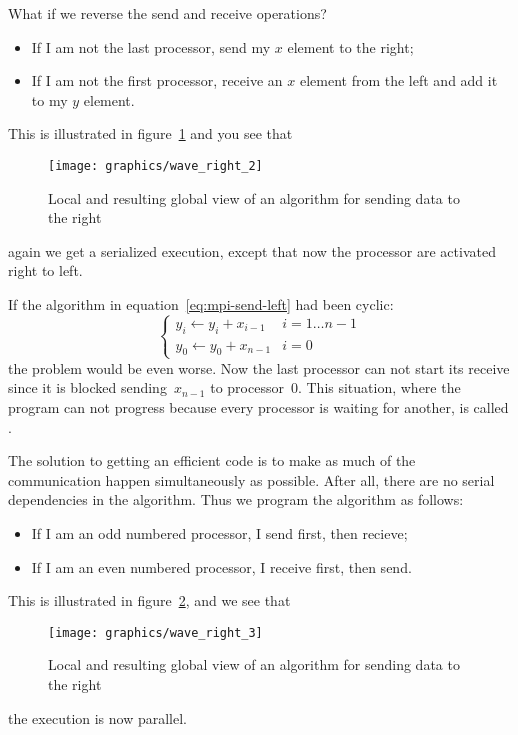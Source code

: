 What if we reverse the send and receive operations?
\begin{itemize}
\item If I am not the last processor, send my $x$ element to the
  right;
\item If I am not the first processor, receive an $x$ element from the
  left and add it to my $y$ element.
\end{itemize}
This is illustrated in figure~\ref{fig:wave_right_2} and you see that
\begin{figure}
  \texttt{[image: graphics/wave\_right\_2]}
  \caption{Local and resulting global view of an algorithm for sending
    data to the right}
  \label{fig:wave_right_2}
\end{figure}
again we get a serialized execution, except that now the processor are
activated right to left.

If the algorithm in equation~\ref{eq:mpi-send-left} had been cyclic:
\begin{equation}
\begin{cases}
y_i\leftarrow y_i+x_{i-1}&i=1\ldots n-1\\ 
y_0\leftarrow y_0+x_{n-1}&i=0
\end{cases}
\label{eq:cyclic-add}
\end{equation}
the problem would be even worse. Now the last processor can not start
its receive since it is blocked sending~$x_{n-1}$ to processor~0. This
situation, where the program can not progress because every processor is
waiting for another, is called . 

The solution to getting an efficient code is to make as much of the
communication happen simultaneously as possible. After all, there are
no serial dependencies in the algorithm. Thus we program the algorithm
as follows:
\begin{itemize}
\item If I am an odd numbered processor, I send first, then recieve;
\item If I am an even numbered processor, I receive first, then send.
\end{itemize}
This is illustrated in figure~\ref{fig:wave_right_3}, and we see that
\begin{figure}
  \texttt{[image: graphics/wave\_right\_3]}
  \caption{Local and resulting global view of an algorithm for sending
    data to the right}
  \label{fig:wave_right_3}
\end{figure}
the execution is now parallel.

